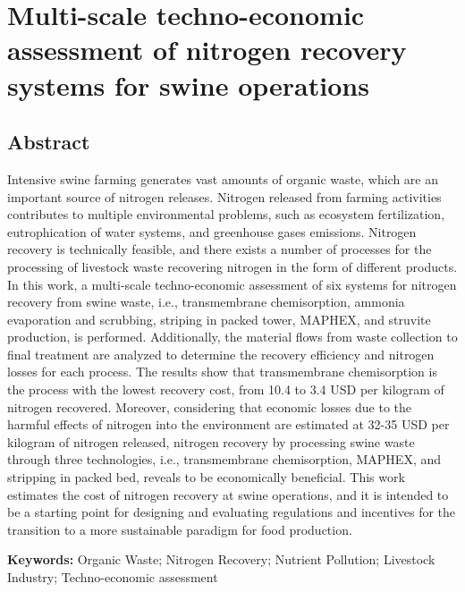 \chapter{Multi-scale techno-economic assessment of nitrogen recovery systems for swine operations }\label{ch:NitrogenTechs}
\begin{refsection}[referencesCh6]
\section*{Abstract}
Intensive swine farming generates vast amounts of organic waste, which are an important source of nitrogen releases. Nitrogen released from farming activities contributes to multiple environmental problems, such as ecosystem fertilization, eutrophication of water systems, and greenhouse gases emissions. Nitrogen recovery is technically feasible, and there exists a number of processes for the processing of livestock waste recovering nitrogen in the form of different products.
In this work, a multi-scale techno-economic assessment of six systems for nitrogen recovery from swine waste, i.e., transmembrane  chemisorption, ammonia evaporation and scrubbing, striping in packed tower, MAPHEX, and struvite production, is performed. Additionally, the material flows from waste collection to final treatment are analyzed to determine the recovery efficiency and nitrogen losses for each  process. The results show that transmembrane chemisorption is the process with the lowest recovery cost, from 10.4 to 3.4 USD per kilogram of nitrogen recovered. Moreover, considering that economic losses due to the harmful effects of nitrogen into the environment are estimated at 32-35 USD per kilogram of nitrogen released, nitrogen recovery by processing swine waste through three technologies, i.e., transmembrane chemisorption, MAPHEX, and stripping in packed bed, reveals to be economically beneficial. This work estimates the cost of nitrogen recovery at swine operations, and it is intended to be a starting point for designing and evaluating regulations and incentives for the transition to a more sustainable paradigm for food production.

\bigskip
\textbf{Keywords:} Organic Waste; Nitrogen Recovery; Nutrient Pollution; Livestock Industry; Techno-economic assessment
\newpage


\end{refsection}
